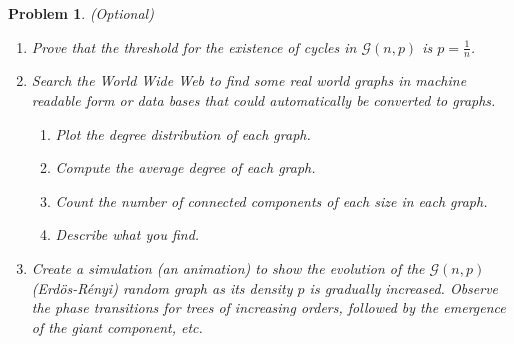 \documentclass[12pt]{article}
\newtheorem{hw}{Problem}
\newenvironment{sol}
  {\par\vspace{3mm}\noindent{\it Solution}.}
  {\qed}
\begin{document}
\begin{hw}(Optional)

\begin{enumerate}

\item Prove that the threshold for the existence of cycles in $\mathcal{G}(n,p)$ is $p=\frac{1}{n}$.
\item Search the \emph{World Wide Web} to find some real world graphs in machine readable form or data bases that could automatically be converted to graphs.

\begin{enumerate}
  \item Plot the degree distribution of each graph.
  \item Compute the average degree of each graph.
  \item Count the number of connected components of each size in each graph.
  \item Describe what you find.
\end{enumerate}
\item Create a simulation (an animation) to  show the evolution of the $\mathcal{G}(n,p)$ (Erd\"{o}s-R\'{e}nyi) random graph as its density $p$ is gradually increased. Observe the phase transitions for trees of increasing orders, followed by the emergence of the giant component, etc.
\end{enumerate}
\end{hw}
\end{document}
